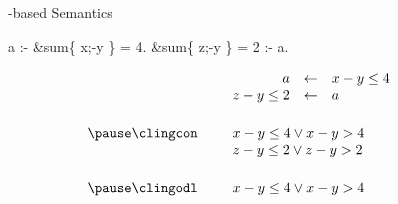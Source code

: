 \begin{frame}[fragile]{\HTC-based Semantics}
  \smallskip
  \begin{semiverbatim}
                           a :- &sum\{ x;-y \} = 4.
            &sum\{ z;-y \} = 2 :- a.
  \end{semiverbatim}
  \bigskip\pause
  \[
    \begin{array}{rp{5pt}rclp{20pt}}
                     && a         &\leftarrow&  x-y\leq 4          &\\
                     && z-y\leq2  &\leftarrow&  a                  &\\[15pt]\pause
    \text{\clingcon} && \multicolumn{3}{l}{x-y\leq 4 \lor x-y > 4} &\\
                     && \multicolumn{3}{l}{z-y\leq 2 \lor z-y>2}   &\\[15pt]\pause
    \text{\clingodl} && \multicolumn{3}{l}{x-y\leq 4 \lor x-y > 4} &
    \end{array}
  \]
\end{frame}
%
